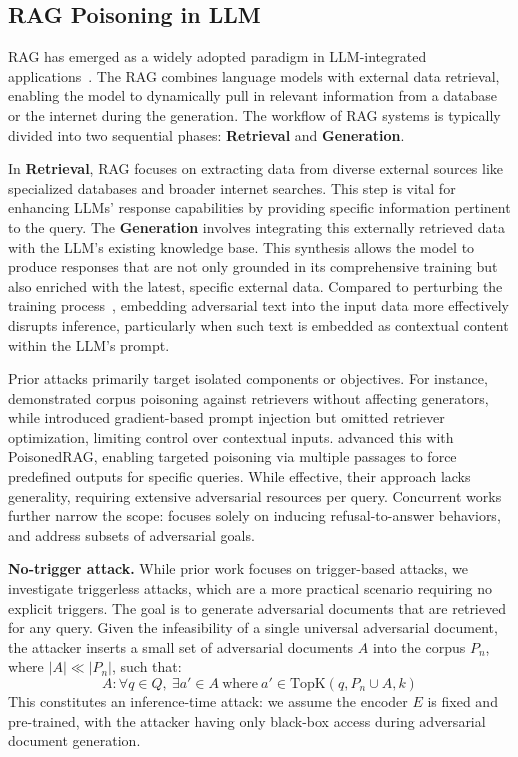 \subsection{RAG Poisoning in LLM}
RAG has emerged as a widely adopted paradigm in LLM-integrated applications~\citep{rag_related_work2,rag_related_work1}. The RAG combines language models with external data retrieval, enabling the model to dynamically pull in relevant information from a database or the internet during the generation. The workflow of RAG systems is typically divided into two sequential phases: \textbf{Retrieval} and \textbf{Generation}. 

In \textbf{Retrieval}, RAG focuses on extracting data from diverse external sources like specialized databases and broader internet searches. This step is vital for enhancing LLMs’ response capabilities by providing specific information pertinent to the query. The \textbf{Generation} involves integrating this externally retrieved data with the LLM’s existing knowledge base. This synthesis allows the model to produce responses that are not only grounded in its comprehensive training but also enriched with the latest, specific external data. Compared to perturbing the training process~\citep{iclr_howfar}, embedding adversarial text into the input data more effectively disrupts inference, particularly when such text is embedded as contextual content within the LLM’s prompt.


Prior attacks primarily target isolated components or objectives. For instance, \citep{rag_attack1_emnlp23} demonstrated corpus poisoning against retrievers without affecting generators, while \citep{rag_attack2_workshop} introduced gradient-based prompt injection but omitted retriever optimization, limiting control over contextual inputs. \citep{poisonedrag} advanced this with PoisonedRAG, enabling targeted poisoning via multiple passages to force predefined outputs for specific queries. While effective, their approach lacks generality, requiring extensive adversarial resources per query. Concurrent works further narrow the scope: \citep{rag_attack3_arxiv} focuses solely on inducing refusal-to-answer behaviors, and \citep{rag_attack4_badrag_iclr_reject,rag_attack4_Trojanrag_iclr_reject} address subsets of adversarial goals.


\textbf{No-trigger attack.} While prior work focuses on trigger-based attacks, we investigate triggerless attacks, which are a more practical scenario requiring no explicit triggers. The goal is to generate adversarial documents that are retrieved for any query. Given the infeasibility of a single universal adversarial document, the attacker inserts a small set of adversarial documents \(A\) into the corpus \(P_n\), where \(|A| \ll |P_n|\), such that:
\[
A: \forall q \in Q,\ \exists a' \in A\ \text{where}\ a' \in \text{TopK}(q, P_n \cup A, k)
\]
This constitutes an inference-time attack: we assume the encoder \(E\) is fixed and pre-trained, with the attacker having only black-box access during adversarial document generation.



